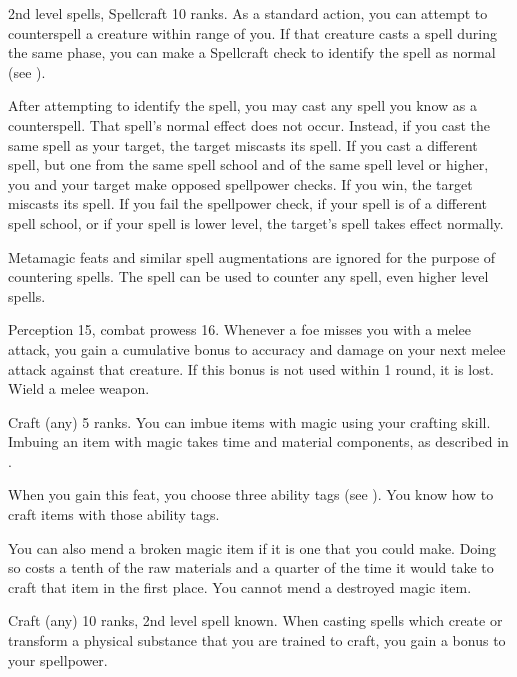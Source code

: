 \featpres 2nd level spells, Spellcraft 10 ranks.
\featben As a standard action, you can attempt to counterspell a creature within \rngmed range of you.
If that creature casts a spell during the same phase, you can make a Spellcraft check to identify the spell as normal (see ).

After attempting to identify the spell, you may cast any spell you know as a counterspell.
That spell's normal effect does not occur.
Instead, if you cast the same spell as your target, the target miscasts its spell.
If you cast a different spell, but one from the same spell school and of the same spell level or higher, you and your target make opposed spellpower checks.
If you win, the target miscasts its spell.
If you fail the spellpower check, if your spell is of a different spell school, or if your spell is lower level, the target's spell takes effect normally.

Metamagic feats and similar spell augmentations are ignored for the purpose of countering spells.
The  spell can be used to counter any spell, even higher level spells.

\featpres Perception 15, combat prowess 16.
\featben Whenever a foe misses you with a melee attack, you gain a cumulative  bonus to accuracy and damage on your next melee attack against that creature.
If this bonus is not used within 1 round, it is lost.
\stylereq Wield a melee weapon.

\featpre Craft (any) 5 ranks.
\featben You can imbue items with magic using your crafting skill.
Imbuing an item with magic takes time and material components, as described in .

When you gain this feat, you choose three ability tags (see ).
You know how to craft items with those ability tags.

You can also mend a broken magic item if it is one that you could make.
Doing so costs a tenth of the raw materials and a quarter of the time it would take to craft that item in the first place.
You cannot mend a destroyed magic item.

\featpres Craft (any) 10 ranks, 2nd level spell known.
\featben When casting spells which create or transform a physical substance that you are trained to craft, you gain a  bonus to your spellpower.

